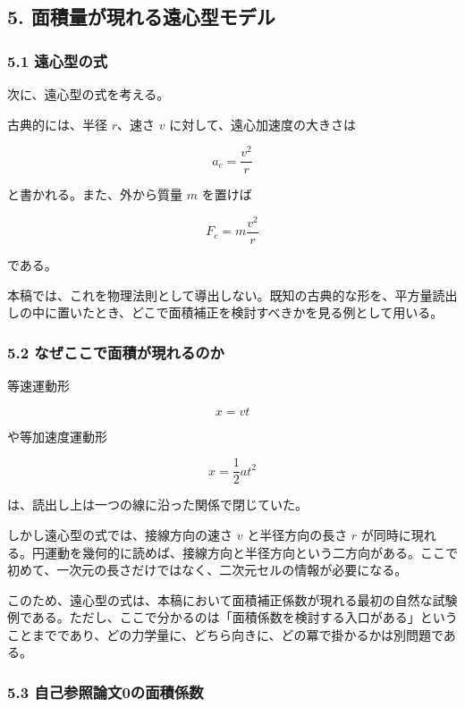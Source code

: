 \documentclass[
]{ltjsarticle}
\begin{document}
\subsection{5.
面積量が現れる遠心型モデル}\label{ux9762ux7a4dux91cfux304cux73feux308cux308bux9060ux5fc3ux578bux30e2ux30c7ux30eb}

\subsubsection{5.1 遠心型の式}\label{ux9060ux5fc3ux578bux306eux5f0f}

次に、遠心型の式を考える。

古典的には、半径 \(r\)、速さ \(v\) に対して、遠心加速度の大きさは

\[
a_c=\frac{v^2}{r}
\]

と書かれる。また、外から質量 \(m\) を置けば

\[
F_c=m\frac{v^2}{r}
\]

である。

本稿では、これを物理法則として導出しない。既知の古典的な形を、平方量読出しの中に置いたとき、どこで面積補正を検討すべきかを見る例として用いる。

\subsubsection{5.2
なぜここで面積が現れるのか}\label{ux306aux305cux3053ux3053ux3067ux9762ux7a4dux304cux73feux308cux308bux306eux304b}

等速運動形

\[
x=vt
\]

や等加速度運動形

\[
x=\frac{1}{2}at^2
\]

は、読出し上は一つの線に沿った関係で閉じていた。

しかし遠心型の式では、接線方向の速さ \(v\) と半径方向の長さ \(r\)
が同時に現れる。円運動を幾何的に読めば、接線方向と半径方向という二方向がある。ここで初めて、一次元の長さだけではなく、二次元セルの情報が必要になる。

このため、遠心型の式は、本稿において面積補正係数が現れる最初の自然な試験例である。ただし、ここで分かるのは「面積係数を検討する入口がある」ということまでであり、どの力学量に、どちら向きに、どの冪で掛かるかは別問題である。

\subsubsection{5.3
自己参照論文0の面積係数}\label{ux81eaux5df1ux53c2ux7167ux8ad6ux65870ux306eux9762ux7a4dux4fc2ux6570}
\end{document}
